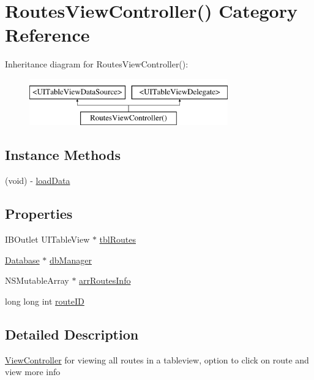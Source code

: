 \hypertarget{categoryRoutesViewController_07_08}{\section{Routes\-View\-Controller() Category Reference}
\label{categoryRoutesViewController_07_08}
}
Inheritance diagram for Routes\-View\-Controller()\-:\begin{figure}[H]
\begin{center}
\leavevmode
\includegraphics[height=2.000000cm]{categoryRoutesViewController_07_08}
\end{center}
\end{figure}
\subsection*{Instance Methods}
\begin{DoxyCompactItemize}
\item 
(void) -\/ \hyperlink{categoryRoutesViewController_07_08_a645f0e489813bf4b9157d99fbe8f6b61}{load\-Data}
\end{DoxyCompactItemize}
\subsection*{Properties}
\begin{DoxyCompactItemize}
\item 
I\-B\-Outlet U\-I\-Table\-View $\ast$ \hyperlink{categoryRoutesViewController_07_08_a07af2b2999a6ccab5e6941b36b22da85}{tbl\-Routes}
\item 
\hyperlink{interfaceDatabase}{Database} $\ast$ \hyperlink{categoryRoutesViewController_07_08_ae146a192b91c7b6f022ee584d49ef4ec}{db\-Manager}
\item 
N\-S\-Mutable\-Array $\ast$ \hyperlink{categoryRoutesViewController_07_08_a87cf4ac6cc3760cb461ca9461e39664a}{arr\-Routes\-Info}
\item 
long long int \hyperlink{categoryRoutesViewController_07_08_a396bf5c25f2fa8ba025e328758148312}{route\-I\-D}
\end{DoxyCompactItemize}


\subsection{Detailed Description}
\hyperlink{interfaceViewController}{View\-Controller} for viewing all routes in a tableview, option to click on route and view more info 

